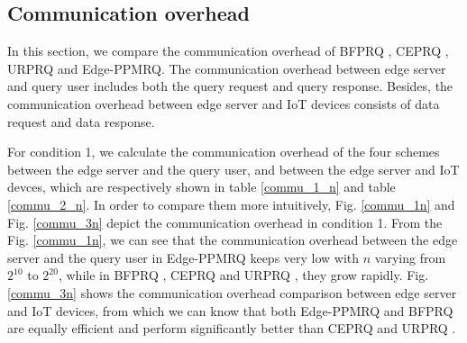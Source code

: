 \documentclass[IEEE JOURNAL OF BIOMEDICAL AND HEALTH INFORMATICS]{IEEEtran}
\begin{document}
\subsection{Communication overhead}
In this section, we compare the communication overhead of BFPRQ \cite{mahdikhani2020IoT}, CEPRQ \cite{hasan2020IoT}, URPRQ \cite{mahdikhani2020using} and Edge-PPMRQ. The communication overhead between edge server and query user includes both the query request and query response. Besides, the communication overhead between edge server and IoT devices consists of data request and data response.
  
  For condition 1, we calculate the communication overhead of the four schemes between the edge server and the query user, and between the edge server and IoT devces, which are respectively shown in table \ref{commu_1_n} and table \ref{commu_2_n}.  In order to compare them more intuitively, Fig. \ref{commu_1n} and Fig. \ref{commu_3n} depict the communication overhead in condition 1. From the Fig. \ref{commu_1n}, we can see that the communication overhead between the edge server and the query user in Edge-PPMRQ keeps very low with $n$ varying from $2^{10}$ to $2^{20}$, while in BFPRQ \cite{mahdikhani2020IoT}, CEPRQ \cite{hasan2020IoT} and URPRQ \cite{mahdikhani2020using}, they grow rapidly. Fig. \ref{commu_3n} shows the communication overhead comparison between edge server and IoT devices, from which we can know that both Edge-PPMRQ and BFPRQ \cite{mahdikhani2020IoT} are equally efficient and perform significantly better than CEPRQ \cite{hasan2020IoT} and URPRQ \cite{mahdikhani2020using}. 
  
  

  
\end{document}
